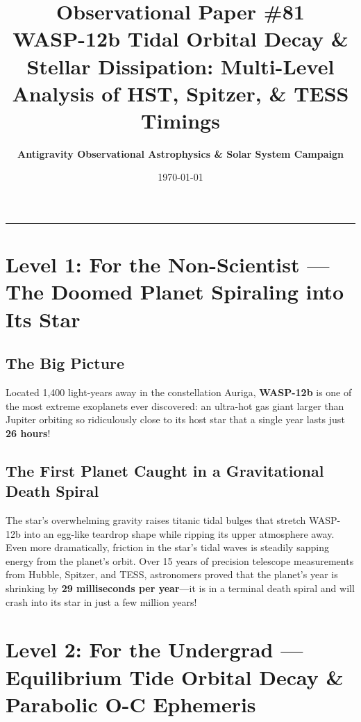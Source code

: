 \documentclass[11pt,a4paper]{article}
\title{\Huge \textbf{Observational Paper \#81}\\ \Large WASP-12b Tidal Orbital Decay \& Stellar Dissipation: Multi-Level Analysis of HST, Spitzer, \& TESS Timings}
\author{\textbf{Antigravity Observational Astrophysics \& Solar System Campaign}}
\date{\today}
\begin{document}
\maketitle

\vspace{-1em}
\begin{center}
\rule{\textwidth}{1.5pt}
\end{center}

\section*{Level 1: For the Non-Scientist — The Doomed Planet Spiraling into Its Star}

\subsection*{The Big Picture}
Located 1,400 light-years away in the constellation Auriga, \textbf{WASP-12b} is one of the most extreme exoplanets ever discovered: an ultra-hot gas giant larger than Jupiter orbiting so ridiculously close to its host star that a single year lasts just \textbf{26 hours}!

\subsection*{The First Planet Caught in a Gravitational Death Spiral}
The star's overwhelming gravity raises titanic tidal bulges that stretch WASP-12b into an egg-like teardrop shape while ripping its upper atmosphere away. Even more dramatically, friction in the star's tidal waves is steadily sapping energy from the planet's orbit. Over 15 years of precision telescope measurements from Hubble, Spitzer, and TESS, astronomers proved that the planet's year is shrinking by \textbf{29 milliseconds per year}—it is in a terminal death spiral and will crash into its star in just a few million years!

\newpage

\section*{Level 2: For the Undergrad — Equilibrium Tide Orbital Decay \& Parabolic O-C Ephemeris}
\end{document}
